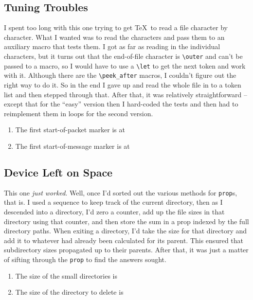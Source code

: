 \documentclass{article}
\begin{document}
\subsection{Tuning Troubles}

I spent too long with this one trying to get \TeX\ to read a file character by character.
What I wanted was to read the characters and pass them to an auxiliary macro that tests them.
I got as far as reading in the individual characters, but it turns out that the end-of-file character is \Verb!\outer! and can't be passed to a macro, so I would have to use a \Verb!\let! to get the next token and work with it.
Although there are the \Verb!\peek_after! macros, I couldn't figure out the right way to do it.
So in the end I gave up and read the whole file in to a token list and then stepped through that.
After that, it was relatively straightforward -- except that for the ``easy'' version then I hard-coded the tests and then had to reimplement them in loops for the second version.


\begin{enumerate}
\item The first start-of-packet marker is at 
\item The first start-of-message marker is at 
\end{enumerate}

\subsection{Device Left on Space}

This one \emph{just worked}.
Well, once I'd sorted out the various methods for \Verb!prop!s, that is.
I used a sequence to keep track of the current directory, then as I descended into a directory, I'd zero a counter, add up the file sizes in that directory using that counter, and then store the sum in a prop indexed by the full directory paths.
When exiting a directory, I'd take the size for that directory and add it to whatever had already been calculated for its parent.
This ensured that subdirectory sizes propagated up to their parents.
After that, it was just a matter of sifting through the \Verb!prop! to find the answers sought.

\begin{enumerate}
\item The size of the small directories is 
\item The size of the directory to delete is 
\end{enumerate}
\end{document}
